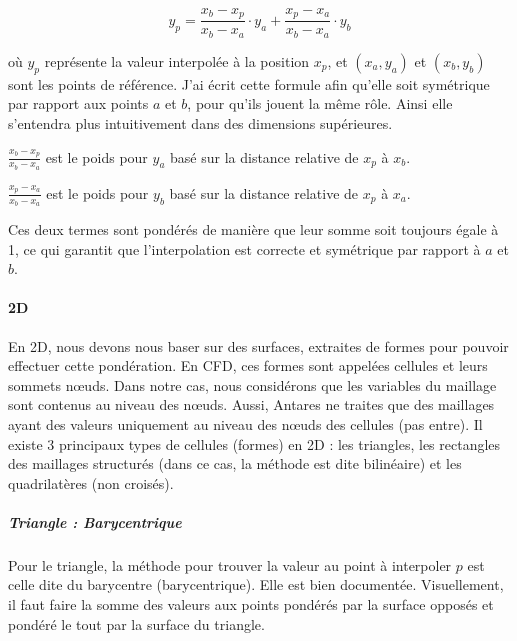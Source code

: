 \[
y_p = \frac{x_b - x_p}{x_b - x_a} \cdot y_a + \frac{x_p - x_a}{x_b - x_a} \cdot y_b
\]

où \( y_p \) représente la valeur interpolée à la position \( x_p \), et \((x_a, y_a)\) et \((x_b, y_b)\) sont les points de référence. J'ai écrit cette formule afin qu'elle soit symétrique par rapport aux points \( a \) et \( b \), pour qu'ils jouent la même rôle. Ainsi elle s'entendra plus intuitivement dans des dimensions supérieures.
\vspace{0.5cm}

        \( \frac{x_b - x_p}{x_b - x_a} \) est le poids pour \( y_a \) basé sur la distance relative de \( x_p \) à \( x_b \).

        \( \frac{x_p - x_a}{x_b - x_a} \) est le poids pour \( y_b \) basé sur la distance relative de \( x_p \) à \( x_a \).\vspace{0.5cm}

Ces deux termes sont pondérés de manière que leur somme soit toujours égale à 1, ce
qui garantit que l'interpolation est correcte et symétrique par rapport à \( a \) et \( b \).\vspace{0.5cm}


\paragraph{2D}

En 2D, nous devons nous baser sur des surfaces, extraites de formes pour pouvoir effectuer cette pondération. En CFD, ces formes sont appelées cellules et leurs sommets nœuds. Dans notre cas, nous considérons que les variables du maillage sont contenus au niveau des nœuds. Aussi, Antares ne traites que des maillages ayant des valeurs uniquement au niveau des nœuds des cellules (pas entre).
Il existe 3 principaux types de cellules (formes) en 2D : les triangles, les rectangles des maillages structurés (dans ce cas, la méthode est dite bilinéaire) et les quadrilatères (non croisés).

\subparagraph{Triangle : Barycentrique}

Pour le triangle, la méthode pour trouver la valeur au point à interpoler \( p \) est celle dite du barycentre (barycentrique).
Elle est bien documentée. Visuellement, il faut faire la somme des valeurs aux points pondérés par la surface opposés et pondéré le tout par la surface du triangle.

